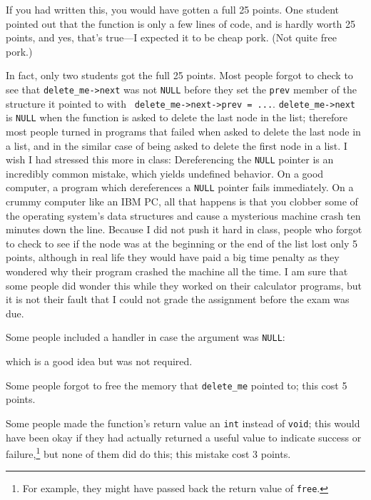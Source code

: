 If you had written this, you would have gotten a full 25 points.  One
student pointed out that the function is only a few lines of code, and
is hardly worth 25 points, and yes, that's true---I expected it to be
cheap pork.  (Not quite free pork.)

In fact, only two students got the full 25 points.  Most people forgot
to check to see that {\tt delete\_me->next} was not {\tt NULL} before
they set the {\tt prev} member of the structure it pointed to with {\tt
delete\_me->next->prev = ...}.  {\tt delete\_me->next} is {\tt NULL}
when the function is asked to delete the last node in the list;
therefore most people turned in programs that failed when asked to
delete the last node in a list, and in the similar case of being asked
to delete the first node in a list.  I wish I had stressed this more in
class: Dereferencing the {\tt NULL} pointer is an incredibly common
mistake, which yields undefined behavior.  On a good computer, a program
which dereferences a {\tt NULL} pointer fails immediately.  On a crummy
computer like an IBM PC, all that happens is that you clobber some of
the operating system's data structures and cause a mysterious machine
crash ten minutes down the line.  Because I did not push it hard in
class, people who forgot to check to see if the node was at the
beginning or the end of the list lost only 5 points, although in real
life they would have paid a big time penalty as they wondered why their
program crashed the machine all the time.  I am sure that some people
did wonder this while they worked on their calculator programs, but it
is not their fault that I could not grade the assignment before the
exam was due.

Some people included a handler in case the argument was {\tt NULL}:

\begin{flushleft}
\verb% if (delete_me == NULL) % \\*
\verb%   return;% 
\end{flushleft}

\noindent which is a good idea but was not required.

Some people forgot to free the memory that {\tt delete\_me} pointed to;
this cost 5 points.  

Some people made the function's return value an {\tt int} instead of
{\tt void}; this would have been okay if they had actually returned a
useful value to indicate success or failure,\footnote{For example, they
might have passed back the return value of {\tt free}.} but none of them
did do this; this mistake cost 3 points.

